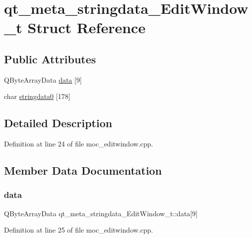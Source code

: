 \hypertarget{structqt__meta__stringdata___edit_window__t}{}\section{qt\+\_\+meta\+\_\+stringdata\+\_\+\+Edit\+Window\+\_\+t Struct Reference}
\label{structqt__meta__stringdata___edit_window__t}
\subsection*{Public Attributes}
\begin{DoxyCompactItemize}
\item 
Q\+Byte\+Array\+Data \mbox{\hyperlink{structqt__meta__stringdata___edit_window__t_a0630c492e3c4e44251c4c11dd035a6bf}{data}} \mbox{[}9\mbox{]}
\item 
char \mbox{\hyperlink{structqt__meta__stringdata___edit_window__t_a3caab11840408e6a615abccc971eaf49}{stringdata0}} \mbox{[}178\mbox{]}
\end{DoxyCompactItemize}


\subsection{Detailed Description}


Definition at line 24 of file moc\+\_\+editwindow.\+cpp.



\subsection{Member Data Documentation}
\mbox{\label{structqt__meta__stringdata___edit_window__t_a0630c492e3c4e44251c4c11dd035a6bf}} 
\subsubsection{\texorpdfstring{data}{data}}
{\footnotesize\ttfamily Q\+Byte\+Array\+Data qt\+\_\+meta\+\_\+stringdata\+\_\+\+Edit\+Window\+\_\+t\+::data\mbox{[}9\mbox{]}}



Definition at line 25 of file moc\+\_\+editwindow.\+cpp.

